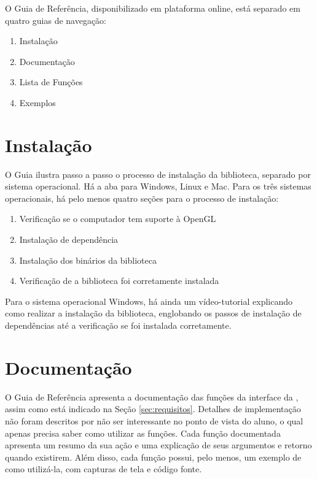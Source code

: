 \label{appendix:guia}
%

%
\newpage

O Guia de Referência, disponibilizado em plataforma online, está separado em quatro guias de navegação:
\begin{enumerate}
	\item Instalação
	\item Documentação
	\item Lista de Funções
	\item Exemplos
\end{enumerate}

\section{Instalação}

O Guia ilustra passo a passo o processo de instalação da biblioteca, separado por sistema operacional. Há a aba para Windows, Linux e Mac. Para os três sistemas operacionais, há pelo menos quatro seções para o processo de instalação:
\begin{enumerate}
	\item Verificação se o computador tem suporte à OpenGL
	\item Instalação de dependência 
	\item Instalação dos binários da biblioteca
	\item Verificação de a biblioteca foi corretamente instalada 
\end{enumerate}
Para o sistema operacional Windows, há ainda um vídeo-tutorial explicando como realizar a instalação da biblioteca, englobando os passos de instalação de dependências até a verificação se foi instalada corretamente.

\section{Documentação}

O Guia de Referência apresenta a documentação das funções da interface da \playAPC{}, assim como está indicado na Seção \ref{sec:requisitos}. Detalhes de implementação não foram descritos por não ser interessante no ponto de vista do aluno, o qual apenas precisa saber como utilizar as funções. Cada função documentada apresenta um resumo da sua ação e uma explicação de seus argumentos e retorno quando existirem. Além disso, cada função possui, pelo menos, um exemplo de como utilizá-la, com capturas de tela e código fonte. 


